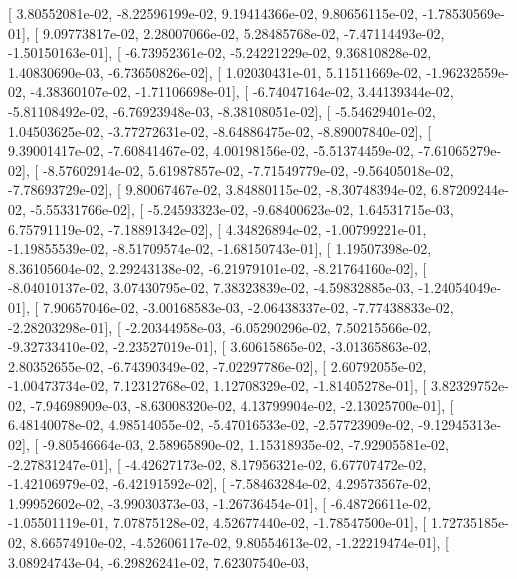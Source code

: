 \documentclass{article}
\begin{document}
       [  3.80552081e-02,  -8.22596199e-02,   9.19414366e-02,
          9.80656115e-02,  -1.78530569e-01],
       [  9.09773817e-02,   2.28007066e-02,   5.28485768e-02,
         -7.47114493e-02,  -1.50150163e-01],
       [ -6.73952361e-02,  -5.24221229e-02,   9.36810828e-02,
          1.40830690e-03,  -6.73650826e-02],
       [  1.02030431e-01,   5.11511669e-02,  -1.96232559e-02,
         -4.38360107e-02,  -1.71106698e-01],
       [ -6.74047164e-02,   3.44139344e-02,  -5.81108492e-02,
         -6.76923948e-03,  -8.38108051e-02],
       [ -5.54629401e-02,   1.04503625e-02,  -3.77272631e-02,
         -8.64886475e-02,  -8.89007840e-02],
       [  9.39001417e-02,  -7.60841467e-02,   4.00198156e-02,
         -5.51374459e-02,  -7.61065279e-02],
       [ -8.57602914e-02,   5.61987857e-02,  -7.71549779e-02,
         -9.56405018e-02,  -7.78693729e-02],
       [  9.80067467e-02,   3.84880115e-02,  -8.30748394e-02,
          6.87209244e-02,  -5.55331766e-02],
       [ -5.24593323e-02,  -9.68400623e-02,   1.64531715e-03,
          6.75791119e-02,  -7.18891342e-02],
       [  4.34826894e-02,  -1.00799221e-01,  -1.19855539e-02,
         -8.51709574e-02,  -1.68150743e-01],
       [  1.19507398e-02,   8.36105604e-02,   2.29243138e-02,
         -6.21979101e-02,  -8.21764160e-02],
       [ -8.04010137e-02,   3.07430795e-02,   7.38323839e-02,
         -4.59832885e-03,  -1.24054049e-01],
       [  7.90657046e-02,  -3.00168583e-03,  -2.06438337e-02,
         -7.77438833e-02,  -2.28203298e-01],
       [ -2.20344958e-03,  -6.05290296e-02,   7.50215566e-02,
         -9.32733410e-02,  -2.23527019e-01],
       [  3.60615865e-02,  -3.01365863e-02,   2.80352655e-02,
         -6.74390349e-02,  -7.02297786e-02],
       [  2.60792055e-02,  -1.00473734e-02,   7.12312768e-02,
          1.12708329e-02,  -1.81405278e-01],
       [  3.82329752e-02,  -7.94698909e-03,  -8.63008320e-02,
          4.13799904e-02,  -2.13025700e-01],
       [  6.48140078e-02,   4.98514055e-02,  -5.47016533e-02,
         -2.57723909e-02,  -9.12945313e-02],
       [ -9.80546664e-03,   2.58965890e-02,   1.15318935e-02,
         -7.92905581e-02,  -2.27831247e-01],
       [ -4.42627173e-02,   8.17956321e-02,   6.67707472e-02,
         -1.42106979e-02,  -6.42191592e-02],
       [ -7.58463284e-02,   4.29573567e-02,   1.99952602e-02,
         -3.99030373e-03,  -1.26736454e-01],
       [ -6.48726611e-02,  -1.05501119e-01,   7.07875128e-02,
          4.52677440e-02,  -1.78547500e-01],
       [  1.72735185e-02,   8.66574910e-02,  -4.52606117e-02,
          9.80554613e-02,  -1.22219474e-01],
       [  3.08924743e-04,  -6.29826241e-02,   7.62307540e-03,
\end{document}
